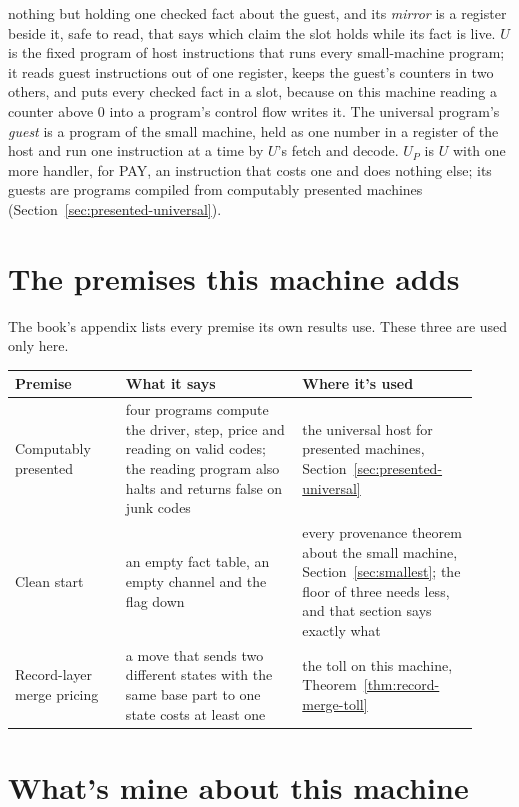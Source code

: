 \documentclass[11pt,twoside]{article}
\theoremstyle{thielethm}
\theoremstyle{thieledef}
\theoremstyle{thieledef}
\theoremstyle{thieledef}
\theoremstyle{thielethm}
\theoremstyle{thieleobs}
\theoremstyle{thielethm}
\begin{document}
nothing but holding one checked fact about the guest, and its \emph{mirror} is a register beside
it, safe to read, that says which claim the slot holds while its fact is live. $U$ is the fixed
program of host instructions that runs every small-machine program; it reads guest
instructions out of one register, keeps the guest's counters in two others, and puts every
checked fact in a slot, because on this machine reading a counter above 0 into a program's control flow writes it. The universal
program's \emph{guest} is a program of the small machine, held as one number in a register of the
host and run one instruction at a time by $U$'s fetch and decode. $U_P$ is $U$ with one more
handler, for PAY, an instruction that costs one and does nothing else; its guests are programs
compiled from computably presented machines (Section~\ref{sec:presented-universal}).

\section{The premises this machine adds}

The book's appendix lists every premise its own results use. These three are used only here.

\begingroup\small
\begin{longtable}{@{}>{\raggedright\arraybackslash}p{0.22\linewidth}>{\raggedright\arraybackslash}p{0.35\linewidth}>{\raggedright\arraybackslash}p{0.35\linewidth}@{}}
\toprule
\textbf{Premise} & \textbf{What it says} & \textbf{Where it's used} \\
\midrule
\endhead
\bottomrule
\endlastfoot
Computably presented & four programs compute the driver, step, price and reading on valid codes; the reading program also halts and returns false on junk codes & the universal host for presented machines, Section~\ref{sec:presented-universal} \\
Clean start & an empty fact table, an empty channel and the flag down & every provenance theorem about the small machine, Section~\ref{sec:smallest}; the floor of three needs less, and that section says exactly what \\
Record-layer merge pricing & a move that sends two different states with the same base part to one state costs at least one & the toll on this machine, Theorem~\ref{thm:record-merge-toll} \\
\end{longtable}
\endgroup

\section{What's mine about this machine}
\end{document}
